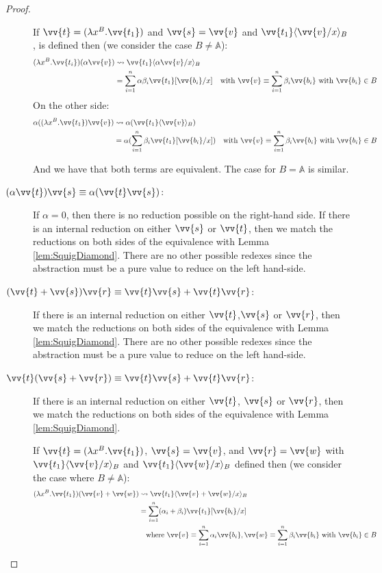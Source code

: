 \documentclass[runningheads,orivec,envcountsame,envcountsect]{llncs}
\newcommand\ansubst[2]{\ensuremath{\langle #1 \rangle_{#2}}}
\newcommand\AbsBasis{\ensuremath{\mathbb{A}}}
\def\Lam#1#2#3{\lambda#1^{#2}{.}#3} %
\def\lraneq{\rightsquigarrow}
\begin{document}
\begin{proof}
\begin{description}
    If $\vv{t} = (\Lam{x}{B}{\vv{t_1}})$ and $\vv{s}=\vv{v}$ and $\vv{t_1}\ansubst{\vv{v}/x}{B}$, is defined then (we consider the case $B\neq\AbsBasis$):
    \begin{align*}
      (\Lam{x}{B}{\vv{t_i}}) (\alpha\vv{v}) &\lraneq \vv{t_1}\ansubst{\alpha\vv{v}/x}{B}\\
      &= \sum_{i=1}^{n} \alpha\beta_i \vv{t_1}[\vv{b_i}/x]\quad \text{with }\vv{v}\equiv\sum_{i=1}^{n} \beta_i \vv{b_i} \text{ with } \vv{b_i}\in B\\
    \end{align*}
    On the other side:
    \begin{align*}
      \alpha ((\Lam{x}{B}{\vv{t_1}}) \vv{v}) &\lraneq \alpha(\vv{t_1}\ansubst{\vv{v}}{B})\\
      &=\alpha(\sum_{i=1}^{n} \beta_i \vv{t_1}[\vv{b_i}/x])\quad \text{with }\vv{v}\equiv\sum_{i=1}^{n} \beta_i \vv{b_i} \text{ with } \vv{b_i}\in B\\
    \end{align*}

    And we have that both terms are equivalent. The case for $B=\AbsBasis$ is similar.

    \item[$(\alpha\vv{t})\vv{s}\equiv\alpha(\vv{t}\vv{s})$:] If $\alpha=0$, then there is no reduction possible on the right-hand side. If there is an internal reduction on either $\vv{s}$ or $\vv{t}$, then we match the reductions on both sides of the equivalence with Lemma \ref{lem:SquigDiamond}. There are no other possible redexes since the abstraction must be a pure value to reduce on the left hand-side.
    
    \item[$(\vv{t}+\vv{s})\vv{r}\equiv \vv{t}\vv{s} + \vv{t}\vv{r}$:] If there is an internal reduction on either $\vv{t}$,$\vv{s}$ or $\vv{r}$, then we match the reductions on both sides of the equivalence with Lemma \ref{lem:SquigDiamond}. There are no other possible redexes since the abstraction must be a pure value to reduce on the left hand-side.
    
    \item[$\vv{t}(\vv{s}+\vv{r})\equiv\vv{t}\vv{s} + \vv{t}\vv{r}$:] If there is an internal reduction on either $\vv{t}$, $\vv{s}$ or $\vv{r}$, then we match the reductions on both sides of the equivalence with Lemma \ref{lem:SquigDiamond}.
    
    If $\vv{t} = (\Lam{x}{B}{\vv{t_1}})$, $\vv{s}=\vv{v}$, and $\vv{r}=\vv{w}$ with
    $\vv{t_1}\ansubst{\vv{v}/x}{B}$ and $\vv{t_1}\ansubst{\vv{w}/x}{B}$ defined then (we consider the case where $B\neq\AbsBasis$):
    \begin{align*}
      (\Lam{x}{B}{\vv{t_1}}) (\vv{v}+\vv{w}) &\lraneq \vv{t_1}\ansubst{\vv{v}+\vv{w}/x}{B}\\
      &=\sum_{i=1}^{n}(\alpha_i+\beta_i)\vv{t_1}[\vv{b_i}/x]\\
      &\quad\text{where }\vv{v}\equiv\sum_{i=1}^{n}\alpha_i\vv{b_i},\vv{w}\equiv\sum_{i=1}^{n}\beta_i\vv{b_i}\text{ with }\vv{b_i}\in B 
    \end{align*}


\end{description}
\end{proof}
\end{document}
